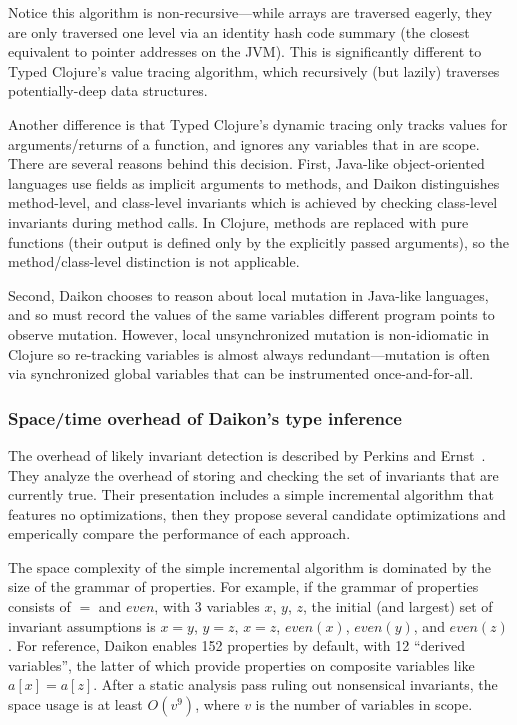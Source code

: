 Notice this algorithm is non-recursive---while arrays are traversed eagerly, they
are only traversed one level via an identity hash code summary (the closest equivalent to
pointer addresses on the JVM).
This is significantly different to Typed Clojure's value tracing algorithm,
which recursively (but lazily) traverses potentially-deep data structures.

Another difference is that Typed Clojure's dynamic tracing only tracks
values for arguments/returns of a function, and ignores any variables
that in are scope. There are several reasons behind this decision.
First, Java-like object-oriented languages use fields as implicit
arguments to methods, and Daikon distinguishes method-level, and class-level
invariants which is achieved by checking class-level invariants during
method calls.
In Clojure, methods are replaced with pure functions (their output is defined only by the
explicitly passed arguments), so the method/class-level distinction is
not applicable.

Second, Daikon chooses to reason about local mutation in Java-like languages,
and so must record the values of the same variables different program points
to observe mutation. However, local unsynchronized mutation is non-idiomatic
in Clojure so re-tracking variables is almost always redundant---mutation is
often via synchronized global variables that can be instrumented once-and-for-all.

\subsubsection{Space/time overhead of Daikon's type inference}

The overhead of likely invariant detection
is described by Perkins and Ernst~\cite{Perkins04efficientincremental}.
They analyze the overhead of storing and checking the set of
invariants that are currently true.
Their presentation includes a simple incremental algorithm that
features no optimizations, then they propose several candidate
optimizations and emperically compare the performance of each
approach.

The space complexity of the simple incremental algorithm is dominated 
by the size of the grammar of properties. For example, if the grammar
of properties consists of $=$ and $even$, with
3 variables $x$, $y$, $z$, the initial (and largest) set of invariant assumptions
is $x = y$, $y = z$, $x = z$, $even(x)$, $even(y)$, and $even(z)$.
For reference, Daikon enables 152 properties by default, with
12 ``derived variables'', the latter of which provide properties on composite variables
like $a[x] = a[z]$. After a static analysis pass ruling out nonsensical invariants,
the space usage is at least $O(v^9)$, where $v$ is the number of variables in scope.

